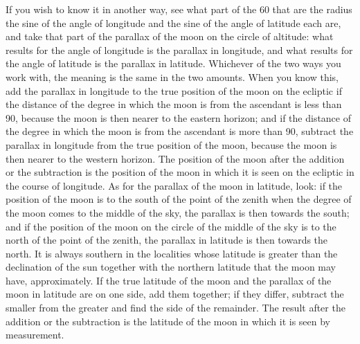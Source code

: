 \documentclass[11pt]{article}
\newcommand{\ArPage}[1]{\marginpar{\footnotesize\color{gray}Ar.\,p.\,#1}}
\begin{document}
\par \ArPage{122}If you wish to know it in another way, see what part of the 60 that are the radius the sine of the angle of longitude and the sine of the angle of latitude each are, and take that part of the parallax of the moon on the circle of altitude: what results for the angle of longitude is the parallax in longitude, and what results for the angle of latitude is the parallax in latitude. Whichever of the two ways you work with, the meaning is the same in the two amounts. When you know this, add the parallax in longitude to the true position of the moon on the ecliptic if the distance of the degree in which the moon is from the ascendant is less than 90, because the moon is then nearer to the eastern horizon; and if the distance of the degree in which the moon is from the ascendant is more than 90, subtract the parallax in longitude from the true position of the moon, because the moon is then nearer to the western horizon. The position of the moon after the addition or the subtraction is the position of the moon in which it is seen on the ecliptic in the course of longitude. As for the parallax of the moon in latitude, look: if the position of the moon is to the south of the point of the zenith when the degree of the moon comes to the middle of the sky, the parallax is then towards the south; and if the position of the moon on the circle of the middle of the sky is to the north of the point of the zenith, the parallax in latitude is then towards the north. It is always southern in the localities whose latitude is greater than the declination of the sun together with the northern latitude that the moon may have, approximately. If the true latitude of the moon and the parallax of the moon in latitude are on one side, add them together; if they differ, subtract the smaller from the greater and find the side of the remainder. The result after the addition or the subtraction is the latitude of the moon in which it is seen by measurement.\par
\end{document}
